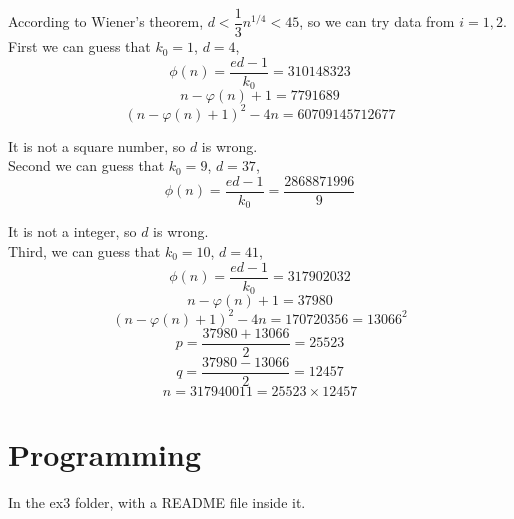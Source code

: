 \documentclass{article}
\begin{document}
According to Wiener's theorem, $d<\dfrac{1}{3}n^{1/4}<45$, so we can try data from $i=1,2$.\\

First we can guess that $k_0=1$, $d=4$, $$\phi(n)=\frac{ed-1}{k_0}=310148323$$
$$n-\varphi(n)+1=7791689$$
$$(n-\varphi(n)+1)^2-4n=60709145712677$$

It is not a square number, so $d$ is wrong.\\

Second we can guess that $k_0=9$, $d=37$, $$\phi(n)=\frac{ed-1}{k_0}=\frac{2868871996}{9}$$

It is not a integer, so $d$ is wrong.\\

Third, we can guess that $k_0=10$, $d=41$, $$\phi(n)=\frac{ed-1}{k_0}=317902032$$
$$n-\varphi(n)+1=37980$$
$$(n-\varphi(n)+1)^2-4n=170720356=13066^2$$
$$p=\frac{37980+13066}{2}=25523$$
$$q=\frac{37980-13066}{2}=12457$$
$$n=317940011=25523\times12457$$

\section{Programming}
In the ex3 folder, with a README file inside it.
\end{document}
